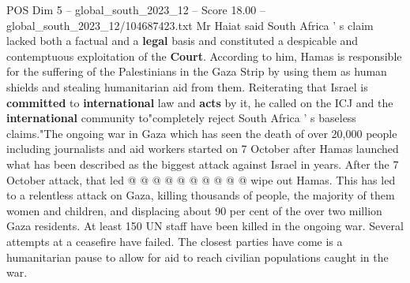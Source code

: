 \begin{textsample}{POS Dim 5 – global\_south\_2023\_12 – Score 18.00 – global\_south\_2023\_12/104687423.txt}
Mr Haiat said South Africa ' s claim lacked both a factual and a \textbf{legal} basis and constituted a despicable and contemptuous exploitation of the \textbf{Court}.
According to him, Hamas is responsible for the suffering of the Palestinians in the Gaza Strip by using them as human shields and stealing humanitarian aid from them.
Reiterating that Israel is \textbf{committed} to \textbf{international} law and \textbf{acts} by it, he called on the ICJ and the \textbf{international} community to"completely reject South Africa ' s baseless claims."The ongoing war in Gaza which has seen the death of over 20,000 people including journalists and aid workers started on 7 October after Hamas launched what has been described as the biggest attack against Israel in years.
After the 7 October attack, that led @ @ @ @ @ @ @ @ @ @ wipe out Hamas.
This has led to a relentless attack on Gaza, killing thousands of people, the majority of them women and children, and displacing about 90 per cent of the over two million Gaza residents.
At least 150 UN staff have been killed in the ongoing war.
Several attempts at a ceasefire have failed.
The closest parties have come is a humanitarian pause to allow for aid to reach civilian populations caught in the war.

\end{textsample}

